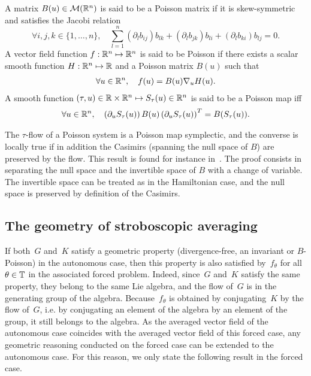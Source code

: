 \begin{definition}
  A matrix $B(u) \in {\cal M}(\mathbb{R}^{n})$ is said to be a Poisson matrix if
  it is skew-symmetric and satisfies the Jacobi relation
  $$
  \forall i,j,k \in \{1,\ldots,n\}, \quad \sum_{l=1}^n (\partial_l b_{ij}) b_{lk} +(\partial_l b_{jk}) b_{li}+(\partial_l b_{ki}) b_{lj} = 0. 
  $$
  A vector field function $f:\mathbb{R}^{n} \mapsto \mathbb{R}^{n}$ is said to be Poisson
  if there exists a scalar smooth function $H:\mathbb{R}^{n} \mapsto \mathbb{R}$ and a
  Poisson matrix $B(u)$ such that 
  \begin{align*}
    \forall u \in \mathbb{R}^{n}, \quad f(u) = B(u) \nabla_u H(u).
  \end{align*}
  A smooth function $(\tau,u) \in \mathbb{R} \times \mathbb{R}^{n} \mapsto  S_\tau(u) \in
  \mathbb{R}^{n}$ is said to be a Poisson map  iff
  \begin{align*}
    \forall u \in \mathbb{R}^{n}, \quad \left(\partial_u S_\tau(u)\right) B(u) \left(\partial_u S_\tau(u)\right)^T = B(S_\tau(u)).
  \end{align*}
\end{definition}

\begin{remark} \label{sec:geometry:rmk:equiv_poisson} The $\tau$-flow of a
  Poisson system is a Poisson map symplectic, and the converse is locally
  true if in addition the Casimirs (spanning the null space of $B$) are
  preserved by the flow. This result is found for instance in~\cite[Chap.
  VII, Thm. 4.5]{hairer.2006.geometric}. The proof consists in separating
  the null space and the invertible space of $B$ with a change of
  variable. The invertible space can be treated as in the Hamiltonian
  case, and the null space is preserved by definition of the Casimirs. 
\end{remark}



\subsection{The geometry of stroboscopic averaging}

If both~$G$ and~$K$ satisfy a geometric property (divergence-free, an
invariant or $B$-Poisson) in the autonomous case, then this property is
also satisfied by~$f_\theta$ for all $\theta \in \mathbb{T}$ in the associated
forced problem. Indeed, since~$G$ and~$K$ satisfy the same property,
they belong to the same Lie algebra, and the flow of~$G$ is in the
generating group of the algebra. Because~$f_\theta$ is obtained by
conjugating~$K$ by the flow of~$G$, i.e. by conjugating an element of
the algebra by an element of the group, it still belongs to the algebra.
As the averaged vector field of the autonomous case coincides with the
averaged vector field of this forced case, any geometric reasoning
conducted on the forced case can be extended to the autonomous case. For
this reason, we only state the following result in the forced case.


